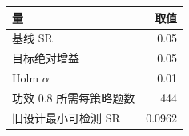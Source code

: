 \begin{tabular}{lr}
\hline
量 & 取值 \\
\hline
基线 SR & 0.05 \\
目标绝对增益 & 0.05 \\
Holm $\alpha$ & 0.01 \\
功效 0.8 所需每策略题数 & 444 \\
旧设计最小可检测 SR & 0.0962 \\
\hline
\end{tabular}
